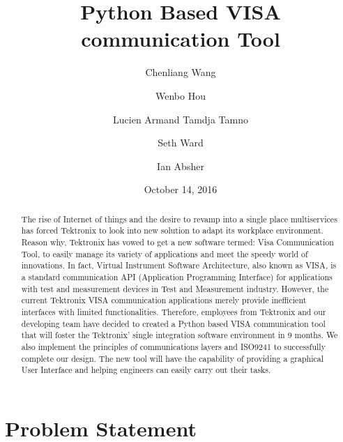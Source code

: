 \documentclass[letterpaper,10pt,notitlepage]{article}
\title{
\textbf{\huge{Python Based VISA communication Tool}} \\
\hfill
\hfill
\hfill
}
\author {Chenliang Wang\and  Wenbo Hou\and Lucien Armand Tamdja Tamno\and Seth Ward \and  Ian Absher}
\date{October 14, 2016}
\begin{document}
\begin{titlepage}
    \begin{center}
    \maketitle
    \begin{abstract}
   The rise of Internet of things and the desire to revamp  into a single place multiservices has forced Tektronix to look into new solution to adapt its workplace environment. Reason why, Tektronix has vowed to get a new software termed: Visa Communication Tool, to easily manage its variety of applications and  meet the speedy world of innovations. In fact, Virtual Instrument Software Architecture, also known as VISA, is a standard communication API (Application Programming Interface) for applications with test and measurement devices in Test and Measurement industry. However, the current Tektronix VISA communication applications merely provide inefficient interfaces with limited functionalities. Therefore, employees from Tektronix and our developing team have decided to created a Python based VISA communication tool that will foster the Tektronix’ single integration software environment in 9 months. We also implement the principles of communications layers and ISO9241 to successfully complete our design.  The new tool will have the capability of providing a graphical User Interface and helping engineers can easily carry out their tasks.
    \end{abstract}
    \end{center}
\end{titlepage}
\section{Problem Statement}
\end{document}
